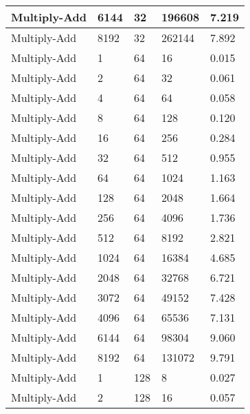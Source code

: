 \documentclass{article}
\begin{document}
\begin{longtable}{|l|l|l|l|l|}
Multiply-Add       & 6144 & 32          & 196608            & 7.219             \\ \hline
Multiply-Add       & 8192 & 32          & 262144            & 7.892             \\ \hline
Multiply-Add       & 1    & 64          & 16                & 0.015             \\ \hline
Multiply-Add       & 2    & 64          & 32                & 0.061             \\ \hline
Multiply-Add       & 4    & 64          & 64                & 0.058             \\ \hline
Multiply-Add       & 8    & 64          & 128               & 0.120             \\ \hline
Multiply-Add       & 16   & 64          & 256               & 0.284             \\ \hline
Multiply-Add       & 32   & 64          & 512               & 0.955             \\ \hline
Multiply-Add       & 64   & 64          & 1024              & 1.163             \\ \hline
Multiply-Add       & 128  & 64          & 2048              & 1.664             \\ \hline
Multiply-Add       & 256  & 64          & 4096              & 1.736             \\ \hline
Multiply-Add       & 512  & 64          & 8192              & 2.821             \\ \hline
Multiply-Add       & 1024 & 64          & 16384             & 4.685             \\ \hline
Multiply-Add       & 2048 & 64          & 32768             & 6.721             \\ \hline
Multiply-Add       & 3072 & 64          & 49152             & 7.428             \\ \hline
Multiply-Add       & 4096 & 64          & 65536             & 7.131             \\ \hline
Multiply-Add       & 6144 & 64          & 98304             & 9.060             \\ \hline
Multiply-Add       & 8192 & 64          & 131072            & 9.791             \\ \hline
Multiply-Add       & 1    & 128         & 8                 & 0.027             \\ \hline
Multiply-Add       & 2    & 128         & 16                & 0.057             \\ \hline

\end{longtable}
\end{document}

